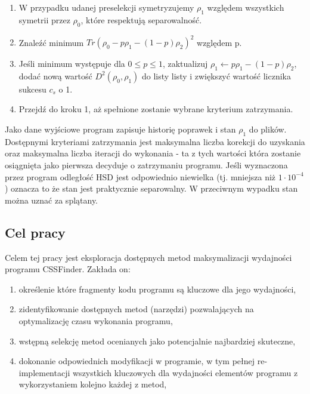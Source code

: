 \documentclass[11pt, a4paper]{article}
\begin{document}
\begin{sloppypar}
\begin{enumerate}
      \item W przypadku udanej preselekcji symetryzujemy $\rho_{1}$ względem wszystkich symetrii
        przez $\rho_{0}$, które respektują separowalność.

      \item Znaleźć minimum $Tr(\rho_{0}- p\rho_{1}- (1 - p)\rho_{2})^{2}$ względem p.

      \item Jeśli minimum występuje dla $0 \le p \le 1$, zaktualizuj
        $\rho_{1}\leftarrow p\rho_{1}- (1 - p)\rho_{2}$, dodać nową wartość $D^{2}(\rho_{0}
        , \rho_{1})$ do listy listy i zwiększyć wartość licznika sukcesu $c_{s}$ o 1.

      \item Przejdź do kroku 1, aż spełnione zostanie wybrane kryterium zatrzymania.
    \end{enumerate}

    Jako dane wyjściowe program zapisuje historię poprawek i stan $\rho_{1}$ do plików. Dostępnymi
    kryteriami zatrzymania jest maksymalna liczba korekcji do uzyskania oraz maksymalna liczba
    iteracji do wykonania - ta z tych wartości która zostanie osiągnięta jako pierwsza decyduje
    o zatrzymaniu programu. Jeśli wyznaczona przez program odległość HSD jest
    odpowiednio niewielka (tj. mniejsza niż $1 \cdot 10^{-4}$) oznacza to że stan jest praktycznie
    separowalny. W przeciwnym wypadku stan można uznać za splątany.

    \subsection{Cel pracy}
    Celem tej pracy jest eksploracja dostępnych metod maksymalizacji wydajności programu
    CSSFinder. Zakłada on:
    \begin{enumerate}
      \item określenie które fragmenty kodu programu są kluczowe dla jego wydajności,

      \item zidentyfikowanie dostępnych metod (narzędzi) pozwalających na optymalizację czasu
        wykonania programu,

      \item wstępną selekcję metod ocenianych jako potencjalnie najbardziej skuteczne,

      \item dokonanie odpowiednich modyfikacji w programie, w tym pełnej re-implementacji
        wszystkich kluczowych dla wydajności elementów programu z wykorzystaniem kolejno
        każdej z metod,


\end{enumerate}
\end{sloppypar}
\end{document}
